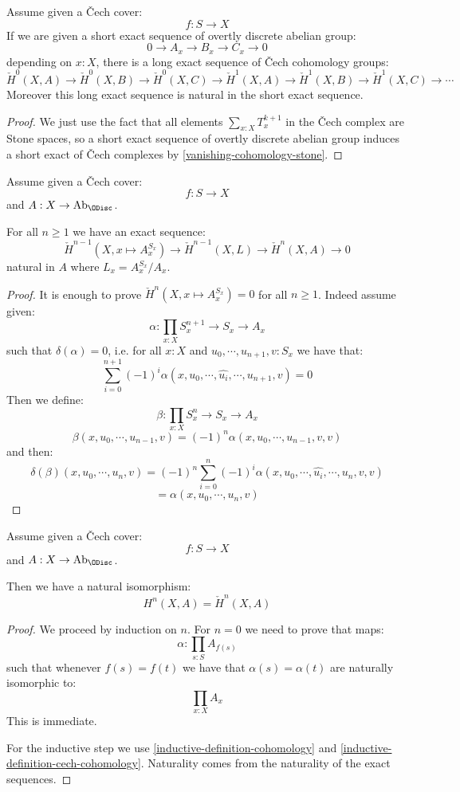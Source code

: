 \begin{lemma}
Assume given a \v{C}ech cover:
\[f:S\to X\]
If we are given a short exact sequence of overtly discrete abelian group:
\[0\to A_x\to B_x\to C_x\to 0\]
depending on $x:X$, there is a long exact sequence of \v{C}ech cohomology groups:
\[\check{H}^0(X,A) \to\check{H}^0(X,B) \to\check{H}^0(X,C) \to\check{H}^1(X,A) \to\check{H}^1(X,B) \to\check{H}^1(X,C) \to\cdots \]
Moreover this long exact sequence is natural in the short exact sequence.
\end{lemma}

\begin{proof}
We just use the fact that all elements $\sum_{x:X} T_x^{k+1}$ in the \v{C}ech complex are Stone spaces, so a short exact sequence of overtly discrete abelian group induces a short exact of \v{C}ech complexes by \cref{vanishing-cohomology-stone}.
\end{proof}

\begin{lemma}\label{inductive-definition-cech-cohomology}
Assume given a \v{C}ech cover:
\[f:S\to X\]
and $A:X\to\mathrm{Ab}_\ODisc$.

For all $n\geq 1$ we have an exact sequence:
\[\check{H}^{n-1}(X,x\mapsto A_x^{S_x}) \to \check{H}^{n-1}(X,L)\to \check{H}^n(X,A)\to 0\]
natural in $A$ where $L_x=A_x^{S_x}/A_x$.
\end{lemma}

\begin{proof}
It is enough to prove $\check{H}^n(X,x\mapsto A_x^{S_x}) = 0$ for all $n\geq 1$. Indeed assume given:
\[\alpha : \prod_{x:X} S_x^{n+1}\to S_x\to A_x\]
such that $\delta(\alpha) = 0$, i.e. for all $x:X$ and $u_0,\cdots, u_{n+1},v:S_x$ we have that:
\[\sum_{i=0}^{n+1}(-1)^i\alpha(x,u_0,\cdots,  \hat{u_i},\cdots ,u_{n+1},v) = 0\]
Then we define:
\[\beta : \prod_{x:X} S_x^{n}\to S_x\to A_x\]
\[\beta(x,u_0,\cdots,u_{n-1},v) = (-1)^n\alpha(x,u_0,\cdots,u_{n-1},v,v)\]
and then:
\[\delta(\beta)(x,u_0,\cdots,u_{n},v) = (-1)^n\sum_{i=0}^{n} (-1)^i \alpha(x,u_0,\cdots,\hat{u_i},\cdots,u_n,v,v) \]
\[= \alpha(x,u_0,\cdots,u_n,v)\]
\end{proof}

\begin{theorem}
Assume given a \v{C}ech cover:
\[f:S\to X\]
and $A:X\to\mathrm{Ab}_\ODisc$.

Then we have a natural isomorphism:
\[H^n(X,A) = \check{H}^n(X,A)\]
\end{theorem}

\begin{proof}
We proceed by induction on $n$. For $n=0$ we need to prove that maps:
\[\alpha:\prod_{s:S}A_{f(s)}\]
such that whenever $f(s)=f(t)$ we have that $\alpha(s) = \alpha(t)$ are naturally isomorphic to:
\[\prod_{x:X}A_x\]
This is immediate.

For the inductive step we use \cref{inductive-definition-cohomology} and \cref{inductive-definition-cech-cohomology}. Naturality comes from the naturality of the exact sequences.
\end{proof}


